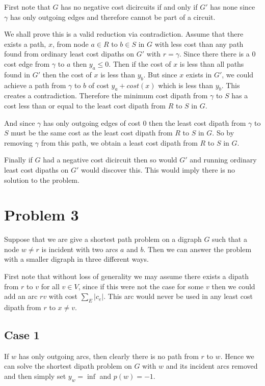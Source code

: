 \documentclass{article}
\begin{document}
First note that $G$ has no negative cost dicircuits if and only if $G'$ has none since $\gamma$ has only outgoing edges and therefore cannot be part of a circuit.

We shall prove this is a valid reduction via contradiction. Assume that there exists a path, $x$, from node $a \in R$ to $b \in S$ in $G$ with less cost than any path found from ordinary least cost dipaths on $G'$ with $r=\gamma$. Since there there is a 0 cost edge from $\gamma$ to $a$ then $y_a \leq 0$. Then if the cost of $x$ is less than all paths found in $G'$ then the cost of $x$ is less than $y_b$. But since $x$ exists in $G'$, we could achieve a path from $\gamma$ to $b$ of cost $y_a + cost(x)$ which is less than $y_b$. This creates a contradiction. Therefore the minimum cost dipath from $\gamma$ to $S$ has a cost less than or equal to the least cost dipath from $R$ to $S$ in $G$. 

And since $\gamma$ has only outgoing edges of cost $0$ then the least cost dipath from $\gamma$ to $S$ must be the same cost as the least cost dipath from $R$ to $S$ in $G$. So by removing $\gamma$ from this path, we obtain a least cost dipath from $R$ to $S$ in $G$.



Finally if $G$ had a negative cost dicircuit then so would $G'$ and running ordinary least cost dipaths on $G'$ would discover this. This would imply there is no solution to the problem.
 
\section*{Problem 3}
Suppose that we are give a shortest path problem on a digraph $G$ such that a node $w\neq r$ is incident with two arcs $a$ and $b$. Then we can answer the problem with a smaller digraph in three different ways. 

First note that without loss of generality we may assume there exists a dipath from $r$ to $v$ for all $v \in V$, since if this were not the case for some $v$ then we could add an arc $rv$ with cost $\sum_E |c_e|$. This arc would never be used in any least cost dipath from $r$ to $x \neq v$.

\subsection*{Case 1}
If $w$ has only outgoing arcs, then clearly there is no path from $r$ to $w$. 
Hence we can solve the shortest dipath problem on $G$ with $w$ and its incident arcs removed and then simply set $y_w = \inf$ and $p(w) = -1$. 
\end{document}
